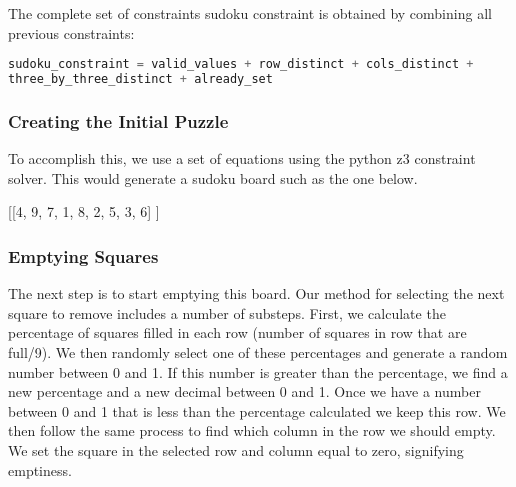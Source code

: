 The complete set of constraints sudoku constraint is obtained by
combining all previous constraints:

\begin{lstlisting}[language=python]
sudoku_constraint = valid_values + row_distinct + cols_distinct +
three_by_three_distinct + already_set
\end{lstlisting}


\subsubsection{Creating the Initial Puzzle}
To accomplish this, we use a set of equations using the python z3
constraint solver. This would generate a sudoku board such as the one
below. \newline

\begin{center}
[[4, 9, 7, 1, 8, 2, 5, 3, 6] \newline
[1, 5, 2, 3, 6, 4, 8, 9, 7] \newline
[8, 6, 3, 5, 7, 9, 4, 1, 2] \newline
[7, 3, 4, 6, 9, 1, 2, 5, 8] \newline
[2, 8, 9, 4, 3, 5, 7, 6, 1] \newline
[5, 1, 6, 7, 2, 8, 9, 4, 3] \newline
[3, 2, 5, 9, 1, 7, 6, 8, 4] \newline
[9, 7, 1, 8, 4, 6, 3, 2, 5] \newline
[6, 4, 8, 2, 5, 3, 1, 7, 9]] \newline
\end{center}

\subsubsection{Emptying Squares}

The next step is to start emptying this board. Our method for
selecting the next square to remove includes a number of
substeps. First, we calculate the percentage of squares filled in each
row (number of squares in row that are full/9). We then randomly
select one of these percentages and generate a random number between 0
and 1. If this number is greater than the percentage, we find a new
percentage and a new decimal between 0 and 1. Once we have a number
between 0 and 1 that is less than the percentage calculated we keep
this row. We then follow the same process to find which column in the
row we should empty. We set the square in the selected row and column
equal to zero, signifying emptiness.


